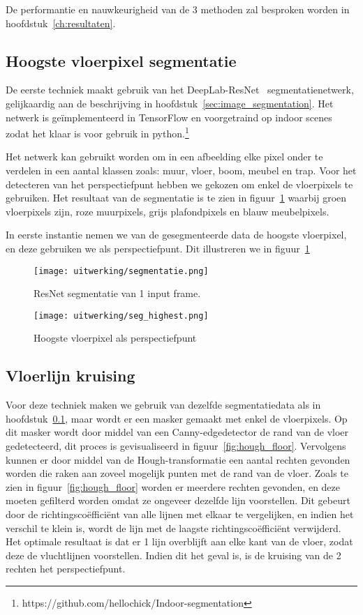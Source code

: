 De performantie en nauwkeurigheid van de 3 methoden zal besproken worden in hoofdstuk~\ref{ch:resultaten}.

\subsection{Hoogste vloerpixel segmentatie}\label{sec:seg_highest}

De eerste techniek maakt gebruik van het DeepLab-ResNet~\cite{resnet101} segmentatienetwerk, gelijkaardig aan de beschrijving in hoofdstuk~\ref{sec:image_segmentation}.
Het netwerk is ge\"{i}mplementeerd in TensorFlow en voorgetraind op indoor scenes zodat het klaar is voor gebruik in python.\footnote{https://github.com/hellochick/Indoor-segmentation}

Het netwerk kan gebruikt worden om in een afbeelding elke pixel onder te verdelen in een aantal klassen zoals: muur, vloer, boom, meubel en trap.
Voor het detecteren van het perspectiefpunt hebben we gekozen om enkel de vloerpixels te gebruiken.
Het resultaat van de segmentatie is te zien in figuur~\ref{fig:floor_seg} waarbij groen vloerpixels zijn, roze muurpixels, grijs plafondpixels en blauw meubelpixels.

In eerste instantie nemen we van de gesegmenteerde data de hoogste vloerpixel, en deze gebruiken we als perspectiefpunt.
Dit illustreren we in figuur~\ref{fig:floor_seg}

\begin{figure}
    \centering
    \texttt{[image: uitwerking/segmentatie.png]}
    \caption{ResNet segmentatie van 1 input frame.}
    \label{fig:floor_seg}
\end{figure}
\begin{figure}
    \centering
    \texttt{[image: uitwerking/seg\_highest.png]}
    \caption{Hoogste vloerpixel als perspectiefpunt}
    \label{fig:highest_pixel}
\end{figure}


\subsection{Vloerlijn kruising}\label{sec:hough_floor}
Voor deze techniek maken we gebruik van dezelfde segmentatiedata als in hoofdstuk~\ref{sec:seg_highest}, maar wordt er een masker gemaakt met enkel de vloerpixels.
Op dit masker wordt door middel van een Canny-edgedetector de rand van de vloer gedetecteerd, dit proces is gevisualiseerd in figuur~\ref{fig:hough_floor}.
Vervolgens kunnen er door middel van de Hough-transformatie een aantal rechten gevonden worden die raken aan zoveel mogelijk punten met de rand van de vloer.
Zoals te zien in figuur~\ref{fig:hough_floor} worden er meerdere rechten gevonden, en deze moeten gefilterd worden omdat ze ongeveer dezelfde lijn voorstellen.
Dit gebeurt door de richtingsco\"{e}ffici\"{e}nt van alle lijnen met elkaar te vergelijken, en indien het verschil te klein is, wordt de lijn met de laagste
richtingsco\"{e}ffici\"{e}nt verwijderd.
Het optimale resultaat is dat er 1 lijn overblijft aan elke kant van de vloer, zodat deze de vluchtlijnen voorstellen.
Indien dit het geval is, is de kruising van de 2 rechten het perspectiefpunt.

